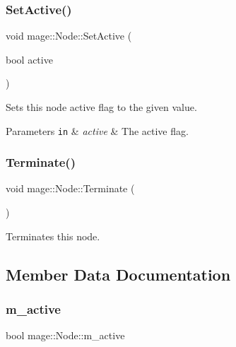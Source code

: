 \subsubsection{\texorpdfstring{Set\+Active()}{SetActive()}}
{\footnotesize\ttfamily void mage\+::\+Node\+::\+Set\+Active (\begin{DoxyParamCaption}\item[{bool}]{active }\end{DoxyParamCaption})\hspace{0.3cm}{\ttfamily [noexcept]}}

Sets this node active flag to the given value.


\begin{DoxyParams}[1]{Parameters}
\mbox{\tt in}  & {\em active} & The active flag. \\
\hline
\end{DoxyParams}
\hypertarget{classmage_1_1_node_aa3dfb60e905aadef7537b1fb5bdc79e6}{}\label{classmage_1_1_node_aa3dfb60e905aadef7537b1fb5bdc79e6} 
\subsubsection{\texorpdfstring{Terminate()}{Terminate()}}
{\footnotesize\ttfamily void mage\+::\+Node\+::\+Terminate (\begin{DoxyParamCaption}{ }\end{DoxyParamCaption})\hspace{0.3cm}{\ttfamily [noexcept]}}

Terminates this node. 

\subsection{Member Data Documentation}
\hypertarget{classmage_1_1_node_ac4dd6c399de8b2a92df92365df7ecdac}{}\label{classmage_1_1_node_ac4dd6c399de8b2a92df92365df7ecdac} 
\subsubsection{\texorpdfstring{m\+\_\+active}{m\_active}}
{\footnotesize\ttfamily bool mage\+::\+Node\+::m\+\_\+active\hspace{0.3cm}{\ttfamily [private]}}

